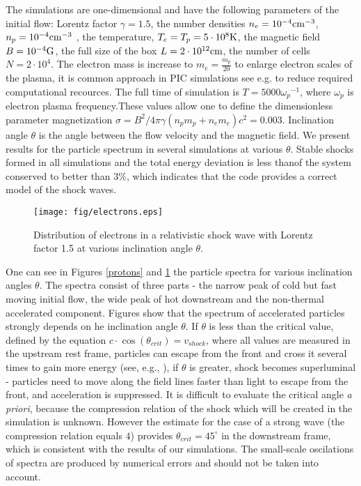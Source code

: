 \documentclass[a4paper]{jpconf}
\begin{document}
The simulations are one-dimensional and have the following parameters of the initial flow: Lorentz factor $\gamma = 1.5$, the number densities $n_e = 10^{-4} \rm{cm}^{-3}$, $n_p = 10^{-4} \rm{cm}^{-3}$ , the temperature, $T_e = T_p = 5\cdot10^8 \rm{K}$, the magnetic field $B = 10^{-4} \rm{G}$, the full size of the box $L = 2\cdot10^{12} \rm{cm}$, the number of cells $N=2\cdot10^4$. The electron mass is increase to $m_e = \frac{m_p}{20}$ to enlarge electron scales of  the plasma, it is common approach in PIC simulations see e.g. {\cite{Sironi2011}} to reduce required computational recources. The full time of simulation is $T = 5000 {\omega_p}^{-1}$, where $\omega_p$ is electron plasma frequency.These values allow one to define the dimensionless parameter magnetization $\sigma = B^2/4\pi\gamma (n_p m_p + n_e m_e) c^2 = 0.003$. Inclination angle $\theta$ is the angle between the flow velocity and the magnetic field. We present results for the particle spectrum in several simulations at various $\theta$. Stable shocks formed in all simulations and the total energy deviation is less thanof the system conserved to better than $3\%$, which indicates that the code provides a correct model of the shock waves. 


\begin{figure}[h!]
	\centering
	\texttt{[image: fig/electrons.eps]} 
	\caption{Distribution of electrons in a relativistic shock wave with Lorentz factor 1.5 at various inclination angle $\theta$.}
	\label{electrons}
\end{figure}

One can see in Figures \ref{protons} and \ref{electrons} the particle spectra for various inclination angles $\theta$. The spectra consist of three parts - the narrow peak of cold but fast moving initial flow, the wide peak of hot downstream and the non-thermal accelerated component. Figures show that the spectrum of accelerated particles strongly depends on he inclination angle $\theta$. If $\theta$ is less than the critical value, defined by the equation $c\cdot \cos(\theta_{crit})=v_{shock}$, where all values are measured in the upstream rest frame, particles can escape from the front and cross it several times to gain more energy (see, e.g., \cite{Pelletier2017}), if $\theta$ is greater, shock becomes superluminal - particles need to move along the field lines faster than light to escape from the front, and acceleration is suppressed. It is difficult to evaluate the critical angle \textit{a priori}, because the compression relation of the shock which will be created in the simulation is unknown. However the estimate for the case of a strong wave (the compression relation equals $4$) provides $\theta_{crit}=45^{\circ}$ in the downstream frame, which is consistent with the results of our simulations. The small-scale oscilations of spectra are produced by numerical errors and should not be taken into account.
\end{document}
